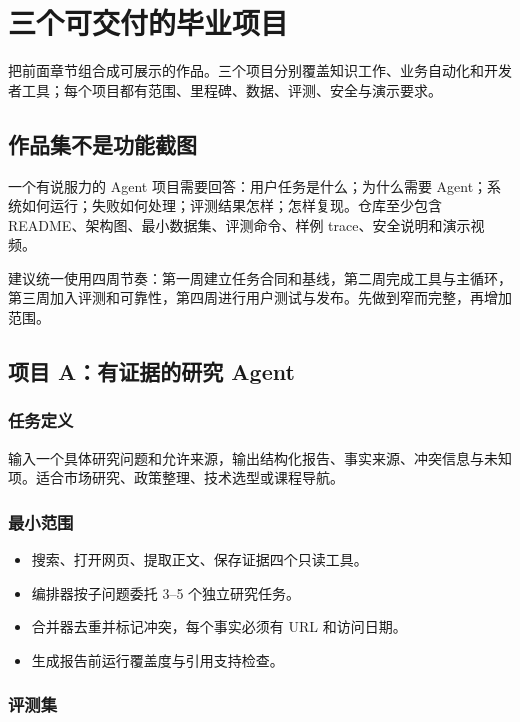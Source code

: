 \chapter{三个可交付的毕业项目}
\label{chap:capstone}

\begin{takeaway}[学习目标]
把前面章节组合成可展示的作品。三个项目分别覆盖知识工作、业务自动化和开发者工具；每个项目都有范围、里程碑、数据、评测、安全与演示要求。
\end{takeaway}

\section{作品集不是功能截图}

一个有说服力的 Agent 项目需要回答：用户任务是什么；为什么需要 Agent；系统如何运行；失败如何处理；评测结果怎样；怎样复现。仓库至少包含 README、架构图、最小数据集、评测命令、样例 trace、安全说明和演示视频。

建议统一使用四周节奏：第一周建立任务合同和基线，第二周完成工具与主循环，第三周加入评测和可靠性，第四周进行用户测试与发布。先做到窄而完整，再增加范围。

\section{项目 A：有证据的研究 Agent}

\subsection{任务定义}

输入一个具体研究问题和允许来源，输出结构化报告、事实来源、冲突信息与未知项。适合市场研究、政策整理、技术选型或课程导航。

\subsection{最小范围}

\begin{itemize}
  \item 搜索、打开网页、提取正文、保存证据四个只读工具。
  \item 编排器按子问题委托 3--5 个独立研究任务。
  \item 合并器去重并标记冲突，每个事实必须有 URL 和访问日期。
  \item 生成报告前运行覆盖度与引用支持检查。
\end{itemize}

\subsection{评测集}

